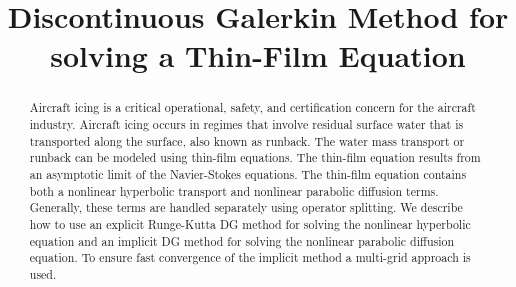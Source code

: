 \documentclass[12pt]{amsart}
\begin{document}
\title[]{Discontinuous Galerkin Method for solving a Thin-Film Equation}
\maketitle
\begin{abstract}
  Aircraft icing is a critical operational, safety, and certification
  concern for the aircraft industry.
  Aircraft icing occurs in regimes that involve residual surface water that is
  transported along the surface, also known as runback.
  The water mass transport or runback can be modeled using thin-film equations.
  The thin-film equation results from an asymptotic limit of the Navier-Stokes
  equations.
  The thin-film equation contains both a nonlinear hyperbolic transport and
  nonlinear parabolic diffusion terms.
  Generally, these terms are handled separately using operator splitting.
  We describe how to use an explicit Runge-Kutta DG method for solving the
  nonlinear hyperbolic equation and an implicit DG method for solving the
  nonlinear parabolic diffusion equation.
  To ensure fast convergence of the implicit method a multi-grid approach is
  used.

\end{abstract}
\end{document}
